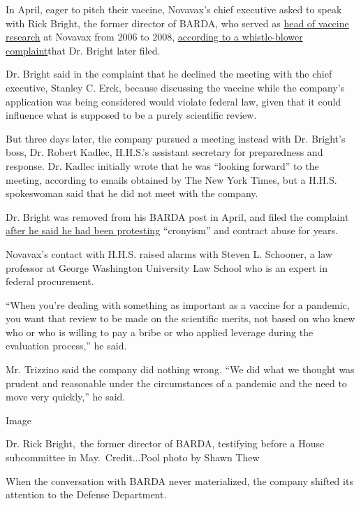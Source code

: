 In April, eager to pitch their vaccine, Novavax's chief executive asked
to speak with Rick Bright, the former director of BARDA, who served as
\href{https://ir.novavax.com/news-releases/news-release-details/novavax-appoints-new-vice-president-vaccine-research}{head
of vaccine research} at Novavax from 2006 to 2008,
\href{https://www.cnn.com/2020/05/05/politics/rick-bright-full-complaint/index.html}{according
to a whistle-blower complaint}that Dr. Bright later filed.

Dr. Bright said in the complaint that he declined the meeting with the
chief executive, Stanley C. Erck, because discussing the vaccine while
the company's application was being considered would violate federal
law, given that it could influence what is supposed to be a purely
scientific review.

But three days later, the company pursued a meeting instead with Dr.
Bright's boss, Dr. Robert Kadlec, H.H.S.'s assistant secretary for
preparedness and response. Dr. Kadlec initially wrote that he was
``looking forward'' to the meeting, according to emails obtained by The
New York Times, but a H.H.S. spokeswoman said that he did not meet with
the company.

Dr. Bright was removed from his BARDA post in April, and filed the
complaint
\href{https://www.nytimes3xbfgragh.onion/2020/05/09/us/politics/whistle-blower-trump-coronavirus.html}{after
he said he had been protesting} ``cronyism'' and contract abuse for
years.

Novavax's contact with H.H.S. raised alarms with Steven L. Schooner, a
law professor at George Washington University Law School who is an
expert in federal procurement.

``When you're dealing with something as important as a vaccine for a
pandemic, you want that review to be made on the scientific merits, not
based on who knew who or who is willing to pay a bribe or who applied
leverage during the evaluation process,'' he said.

Mr. Trizzino said the company did nothing wrong. ``We did what we
thought was prudent and reasonable under the circumstances of a pandemic
and the need to move very quickly,'' he said.

Image

Dr. Rick Bright,~the former director of BARDA, testifying before a House
subcommittee in May.~Credit...Pool photo by Shawn Thew

When the conversation with BARDA never materialized, the company shifted
its attention to the Defense Department.

